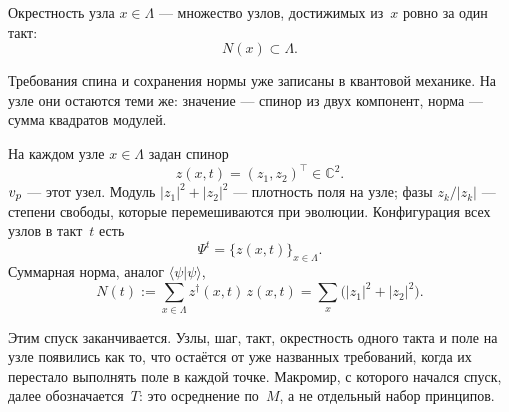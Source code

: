 \begin{definition}
\label{def:neighborhood}
Окрестность узла $x\in\Lambda$ --- множество узлов, достижимых из~$x$
ровно за один такт:
\[
  N(x)\subset\Lambda.
\]
\end{definition}

Требования спина и сохранения нормы уже записаны в квантовой механике.
На узле они остаются теми же:
значение --- спинор из двух компонент, норма --- сумма квадратов модулей.

\begin{definition}
\label{def:field-a3}
На каждом узле $x\in\Lambda$ задан спинор
\[
  z(x,t)=(z_1,z_2)^\top\in\mathbb{C}^2.
\]
$v_p$ --- этот узел.
Модуль $|z_1|^2+|z_2|^2$ --- плотность поля на узле;
фазы $z_k/|z_k|$ --- степени свободы, которые перемешиваются при эволюции.
Конфигурация всех узлов в такт~$t$ есть
\[
  \Psi^t=\{z(x,t)\}_{x\in\Lambda}.
\]
Суммарная норма, аналог $\langle\psi|\psi\rangle$,
\[
  N(t):=\sum_{x\in\Lambda} z^\dagger(x,t)\,z(x,t)=\sum_x\bigl(|z_1|^2+|z_2|^2\bigr).
\]
\end{definition}

Этим спуск заканчивается.
Узлы, шаг, такт, окрестность одного такта и поле на узле
появились как то, что остаётся от уже названных требований,
когда их перестало выполнять поле в каждой точке.
Макромир, с которого начался спуск, далее обозначается~$T$:
это осреднение по~$M$, а не отдельный набор принципов.
